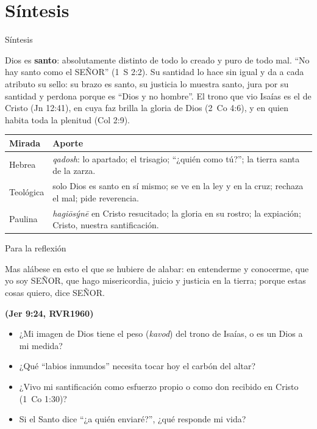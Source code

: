 \documentclass[hyperref={bookmarks=false},aspectratio=169]{beamer}
\newcommand{\SENOR}{S{\fontsize{0.78em}{1em}\selectfont EÑOR}}
\newcommand{\fuente}[1]{\par\hfill{\upshape\bfseries\footnotesize\textcolor{azul}{#1}}}
\newcommand{\destacar}[1]{\textbf{\textcolor{azul}{#1}}}
\begin{document}
\section{Síntesis}

\begin{frame}{Síntesis}
\begin{tcolorbox}[colback=papiro,colframe=azul,boxrule=1pt,arc=3pt]
\small Dios es \destacar{santo}: absolutamente distinto de todo lo creado y puro de todo mal. ``No hay santo como el \SENOR'' (1~S 2:2). Su santidad lo hace sin igual y da a cada atributo su sello: su brazo es santo, su justicia lo muestra santo, jura por su santidad y perdona porque es ``Dios y no hombre''. El trono que vio Isaías es el de Cristo (Jn 12:41), en cuya faz brilla la gloria de Dios (2~Co 4:6), y en quien habita toda la plenitud (Col 2:9).
\end{tcolorbox}
\scriptsize\renewcommand{\arraystretch}{1.2}
\begin{tabular}{@{}>{\RaggedRight\arraybackslash}p{2.4cm}>{\RaggedRight\arraybackslash}p{9.4cm}@{}}
\toprule
\textbf{Mirada} & \textbf{Aporte} \\ \midrule
Hebrea & \emph{qadosh}: lo apartado; el trisagio; ``¿quién como tú?''; la tierra santa de la zarza. \\
Teológica & solo Dios es santo en sí mismo; se ve en la ley y en la cruz; rechaza el mal; pide reverencia. \\
Paulina & \emph{hagiōsýnē} en Cristo resucitado; la gloria en su rostro; la expiación; Cristo, nuestra santificación. \\
\bottomrule
\end{tabular}
\end{frame}

\begin{frame}{Para la reflexión}
\begin{cita}Mas alábese en esto el que se hubiere de alabar: en entenderme y conocerme, que yo soy \SENOR, que hago misericordia, juicio y justicia en la tierra; porque estas cosas quiero, dice \SENOR.\fuente{(Jer 9:24, RVR1960)}\end{cita}
\small
\begin{itemize}
\item ¿Mi imagen de Dios tiene el peso (\emph{kavod}) del trono de Isaías, o es un Dios a mi medida?
\item ¿Qué ``labios inmundos'' necesita tocar hoy el carbón del altar?
\item ¿Vivo mi santificación como esfuerzo propio o como don recibido en Cristo (1~Co 1:30)?
\item Si el Santo dice ``¿a quién enviaré?'', ¿qué responde mi vida?
\end{itemize}
\end{frame}
\end{document}
